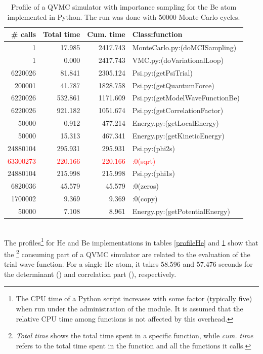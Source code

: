 \begin{table}
\centering
\begin{tabular}{rrrl}
\toprule[1pt]
\textbf{\# calls} & \textbf{Total time} & \textbf{Cum. time} & \textbf{Class:function}\\
\midrule[1pt]
			1  & 17.985  & 2417.743 & \footnotesize{MonteCarlo.py:(doMCISampling)}\\
			1  &  0.000  & 2417.743 & \footnotesize{VMC.py:(doVariationalLoop)}\\
6220026  & 81.841  & 2305.124 & \footnotesize{Psi.py:(getPsiTrial)}\\
	200001 &  41.787 & 1828.758 & \footnotesize{Psi.py:(getQuantumForce)}\\
6220026  & 532.861 & 1171.609 & \footnotesize{Psi.py:(getModelWaveFunctionBe)}\\
6220026  & 921.182 & 1051.674 & \footnotesize{Psi.py:(getCorrelationFactor)}\\
	50000  &  0.912  & 477.214  & \footnotesize{Energy.py:(getLocalEnergy)}\\
	50000  & 15.313  & 467.341  & \footnotesize{Energy.py:(getKineticEnergy)}\\
24880104 & 295.931 & 295.931  & \footnotesize{Psi.py:(phi2s)}\\
\textcolor{red}{63300273} & \textcolor{red}{220.166} & \textcolor{red}{220.166}  & \textcolor{red}{\footnotesize{:0(sqrt)}}\\
24880104 & 215.998 & 215.998  & \footnotesize{Psi.py:(phi1s)}\\
6820036  & 45.579  & 45.579   & \footnotesize{:0(zeros)}\\
1700002  & 9.369   & 9.369    & \footnotesize{:0(copy)}\\
	50000  &  7.108  & 8.961    & \footnotesize{Energy.py:(getPotentialEnergy)}\\
\bottomrule[1pt]
\end{tabular}\caption{Profile of a QVMC simulator with importance sampling for the Be atom implemented in Python. The run was done with 50000 Monte Carlo cycles.}
\label{profileBe}
\end{table}
\noindent
\\
The profiles\footnote{The CPU time of a Python script increases with some factor (typically five\cite{HPL2008}) when run under the administration of the  module. It is assumed that the relative CPU time among functions is not affected by this overhead.} for He and Be implementations in tables \ref{profileHe} and \ref{profileBe} show that the \footnote{\emph{Total time} shows the  total time spent in a specific function, while \emph{cum. time} refers to the total time spent in the function and all the functions it calls.} consuming part of a QVMC simulator are related to the evaluation of the trial wave function. For a single He atom, it takes  58.596 and 57.476 seconds for the determinant () and correlation part (), respectively.\\
